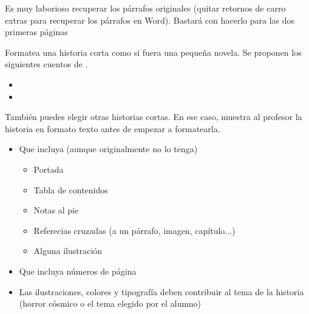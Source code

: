 \begin{Aviso}
   Es muy laborioso recuperar los párrafos originales (quitar retornos de carro extras para recuperar los párrafos en Word). Bastará con hacerlo para las dos primeras páginas
\end{Aviso}

\newpage

\begin{homeworkProblem}
  Formatea una historia corta como si fuera una pequeña novela. Se proponen los siguientes cuentos de . 
  \begin{itemize}
  \item {}
  \item {}
  \end{itemize}
  También puedes elegir otras historias cortas. En ese caso, muestra al profesor la historia en formato texto antes de empezar a formatearla.

  \begin{Aviso}

    \begin{itemize}
    \item Que incluya (aunque originalmente no lo tenga)
      \begin{itemize}
      \item Portada
      \item Tabla de contenidos
      \item Notas al pie
      \item Referecias cruzadas (a un párrafo, imagen, capítulo...)
      \item Alguna ilustración
      \end{itemize}
    \item Que incluya números de página
    \item Las ilustraciones, colores y tipografía deben contribuir al tema de la historia (horror cósmico o el tema elegido por el alumno)
    \end{itemize}
  \end{Aviso}
  
\end{homeworkProblem}




